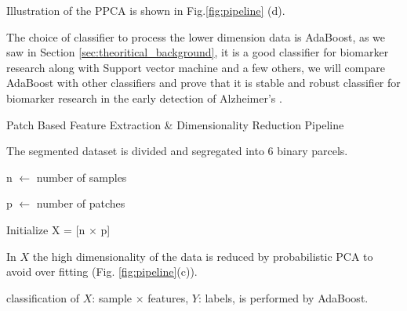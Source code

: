 \documentclass[authoryear,preprint,revi	ew,12pt]{elsarticle}
\newcommand{\Sec}[1]  {Section \ref{sec:#1}}
\newcommand{\Alz} {{Alzheimer\textquoteright s} }
\begin{document}
Illustration of the PPCA is shown in Fig.\ref{fig:pipeline} (d).

The choice of classifier to process the lower dimension data is AdaBoost, as we saw in \Sec{theoritical_background}, it is a good classifier for biomarker research along with Support vector machine and a few others, we will compare AdaBoost with other classifiers and prove that it is stable and robust classifier for biomarker research in the early detection of \Alz.

\begin{algorithm}
	\caption{Patch Based Feature Extraction \& Dimensionality Reduction Pipeline}\label{alg:pipeline}
	
	
	The segmented dataset is divided and segregated into 6 binary parcels.
	
	 {
		
		n $ \gets $ number of samples
		
		p $ \gets $ number of patches
		
		Initialize X = [n $ \times $ p]
		
		
		In $ X $ the high dimensionality of the data is reduced by probabilistic PCA to avoid over fitting (Fig. \ref{fig:pipeline}(c)).
		
		classification of $ X $: sample $ \times $ features, $ Y $: labels, is performed by AdaBoost. 
	}
\end{algorithm}
\end{document}
